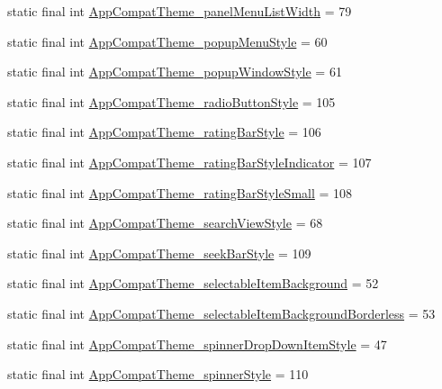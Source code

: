 \begin{DoxyCompactItemize}
\item 
static final int \hyperlink{classproject4_1_1xaria_1_1R_1_1styleable_a43aec01657d9d84df72132aef49c3979}{App\+Compat\+Theme\+\_\+panel\+Menu\+List\+Width} = 79
\item 
static final int \hyperlink{classproject4_1_1xaria_1_1R_1_1styleable_abd4023d3d2a91ab681c1225563f99a45}{App\+Compat\+Theme\+\_\+popup\+Menu\+Style} = 60
\item 
static final int \hyperlink{classproject4_1_1xaria_1_1R_1_1styleable_af65cde560faf376a1a1d60f7eb858a6d}{App\+Compat\+Theme\+\_\+popup\+Window\+Style} = 61
\item 
static final int \hyperlink{classproject4_1_1xaria_1_1R_1_1styleable_a76cf668ccbb7d7b487042d61c9b4a2e1}{App\+Compat\+Theme\+\_\+radio\+Button\+Style} = 105
\item 
static final int \hyperlink{classproject4_1_1xaria_1_1R_1_1styleable_a89d18e267c360b44756771f540ab88f2}{App\+Compat\+Theme\+\_\+rating\+Bar\+Style} = 106
\item 
static final int \hyperlink{classproject4_1_1xaria_1_1R_1_1styleable_af3937cdc8aa3bd4b266711ff72f3eebb}{App\+Compat\+Theme\+\_\+rating\+Bar\+Style\+Indicator} = 107
\item 
static final int \hyperlink{classproject4_1_1xaria_1_1R_1_1styleable_aaf8de5a19d0b128396fe6e219e2988aa}{App\+Compat\+Theme\+\_\+rating\+Bar\+Style\+Small} = 108
\item 
static final int \hyperlink{classproject4_1_1xaria_1_1R_1_1styleable_ad924c1e6f178ccfee69b445c201c2e63}{App\+Compat\+Theme\+\_\+search\+View\+Style} = 68
\item 
static final int \hyperlink{classproject4_1_1xaria_1_1R_1_1styleable_a443f701138b45301d896b25f88f24834}{App\+Compat\+Theme\+\_\+seek\+Bar\+Style} = 109
\item 
static final int \hyperlink{classproject4_1_1xaria_1_1R_1_1styleable_ad619b68b2480af24fe678380486bcf3e}{App\+Compat\+Theme\+\_\+selectable\+Item\+Background} = 52
\item 
static final int \hyperlink{classproject4_1_1xaria_1_1R_1_1styleable_ab2466f3fbbecad455aa1db2f009363f0}{App\+Compat\+Theme\+\_\+selectable\+Item\+Background\+Borderless} = 53
\item 
static final int \hyperlink{classproject4_1_1xaria_1_1R_1_1styleable_afdbe9190461391839d559af54a7397ed}{App\+Compat\+Theme\+\_\+spinner\+Drop\+Down\+Item\+Style} = 47
\item 
static final int \hyperlink{classproject4_1_1xaria_1_1R_1_1styleable_a918d109191c529fed6f95201986203af}{App\+Compat\+Theme\+\_\+spinner\+Style} = 110

\end{DoxyCompactItemize}
